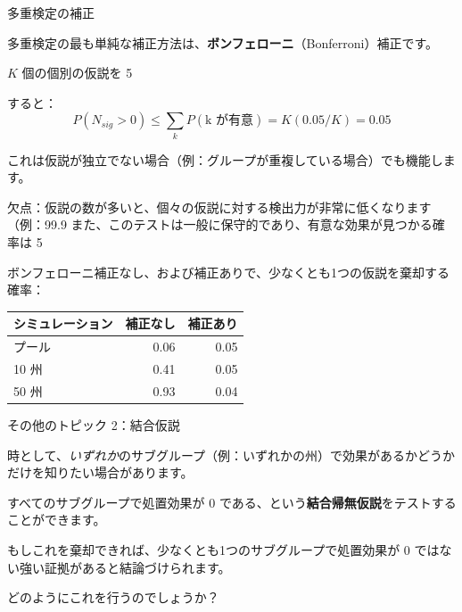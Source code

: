 \documentclass[11pt,handout]{beamer}
\newenvironment{wideitemize}{\itemize\addtolength{\itemsep}{10pt}}{\enditemize}
\begin{document}
\begin{frame}{多重検定の補正}
\begin{wideitemize}
	\item
	多重検定の最も単純な補正方法は、\textbf{ボンフェローニ}（Bonferroni）補正です。
	
	\pause
	\item
	$K$ 個の個別の仮説を 5%
	
	\pause
	\item
	すると：
	$$P( N_{sig} > 0  ) \leq \sum_k P( \text{k が有意}  ) = K (0.05/K) = 0.05 $$
	
	\pause
	\item
	これは仮説が独立でない場合（例：グループが重複している場合）でも機能します。
	
	\pause
	\item
	欠点：仮説の数が多いと、個々の仮説に対する検出力が非常に低くなります（例：99.9%
	また、このテストは一般に保守的であり、有意な効果が見つかる確率は 5%
		
\end{wideitemize}	
\end{frame}


\begin{frame}
	ボンフェローニ補正なし、および補正ありで、少なくとも1つの仮説を棄却する確率： \\
	\begin{tabular}{lrr}
		シミュレーション & 補正なし & 補正あり \\ \hline
		プール & 0.06 & 0.05 \\
		10 州 & 0.41 &  0.05 \\
		50 州 & 0.93 & 0.04
	\end{tabular}
\end{frame}


\begin{frame}{その他のトピック 2：結合仮説}
	\begin{wideitemize}
		\item
		時として、\textit{いずれか}のサブグループ（例：いずれかの州）で効果があるかどうかだけを知りたい場合があります。
		
		\pause
		\item
		すべてのサブグループで処置効果が 0 である、という\textbf{結合帰無仮説}をテストすることができます。
		
		\pause
		\item
		もしこれを棄却できれば、少なくとも1つのサブグループで処置効果が 0 ではない強い証拠があると結論づけられます。
		
		\pause
		\item
		どのようにこれを行うのでしょうか？
		
	\end{wideitemize}	
\end{frame}
\end{document}
